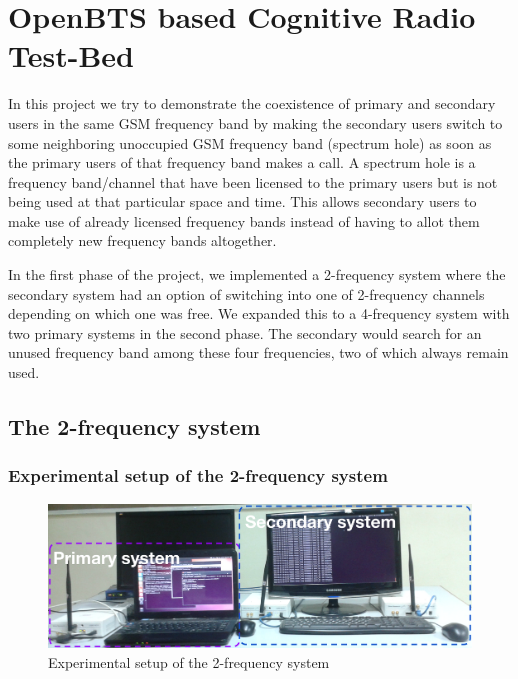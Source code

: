 \chapter{OpenBTS based Cognitive Radio Test-Bed}

In this project we try to demonstrate the coexistence of primary and secondary
users in the same GSM frequency band by making the secondary users switch to 
some neighboring unoccupied GSM frequency band (spectrum hole) as soon as the 
primary users of that frequency band makes a call. A spectrum hole is a 
frequency band/channel that have been licensed to the primary users but is not 
being used at that particular space and time. This allows secondary users to 
make use of already licensed frequency bands instead of having to allot them 
completely new frequency bands altogether.

In the first phase of the project, we implemented a 2-frequency system where
the secondary system had an option of switching into one of 2-frequency 
channels depending on which one was free. We expanded this to a 4-frequency
system with two primary systems in the second phase. The secondary would 
search for an unused frequency band among these four frequencies, two of which
always remain used.

\section{The 2-frequency system}
\subsection{Experimental setup of the 2-frequency system}

\begin{figure}
\centering
\includegraphics[width=1\textwidth]{../images/freq2}
\caption[Experimental setup, 2-frequency system]{Experimental setup of the 
2-frequency system}
\label{freq2}
\end{figure}



